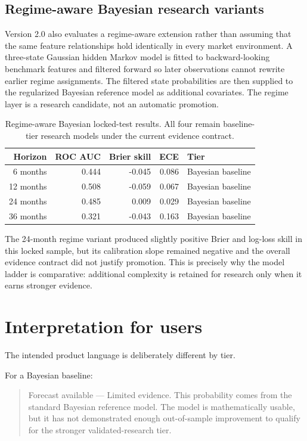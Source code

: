 \documentclass[11pt]{article}
\begin{document}
\subsection{Regime-aware Bayesian research variants}
Version 2.0 also evaluates a regime-aware extension rather than assuming that the same feature relationships hold identically in every market environment. A three-state Gaussian hidden Markov model is fitted to backward-looking benchmark features and filtered forward so later observations cannot rewrite earlier regime assignments. The filtered state probabilities are then supplied to the regularized Bayesian reference model as additional covariates. The regime layer is a research candidate, not an automatic promotion.

\begin{table}[ht]
\centering
\caption{Regime-aware Bayesian locked-test results. All four remain baseline-tier research models under the current evidence contract.}
\begin{tabular}{rrrrl}
\toprule
Horizon & ROC AUC & Brier skill & ECE & Tier\\
\midrule
6 months  & 0.444 & -0.045 & 0.086 & Bayesian baseline\\
12 months & 0.508 & -0.059 & 0.067 & Bayesian baseline\\
24 months & 0.485 &  0.009 & 0.029 & Bayesian baseline\\
36 months & 0.321 & -0.043 & 0.163 & Bayesian baseline\\
\bottomrule
\end{tabular}
\end{table}

The 24-month regime variant produced slightly positive Brier and log-loss skill in this locked sample, but its calibration slope remained negative and the overall evidence contract did not justify promotion. This is precisely why the model ladder is comparative: additional complexity is retained for research only when it earns stronger evidence.


\section{Interpretation for users}
The intended product language is deliberately different by tier.

For a Bayesian baseline:
\begin{quote}
Forecast available --- Limited evidence. This probability comes from the standard Bayesian reference model. The model is mathematically usable, but it has not demonstrated enough out-of-sample improvement to qualify for the stronger validated-research tier.
\end{quote}
\end{document}
